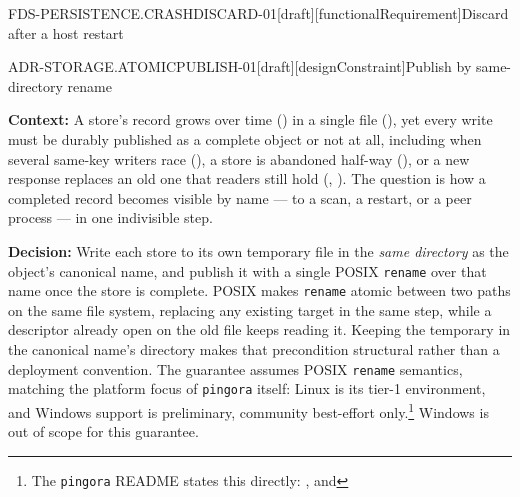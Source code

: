 \begin{requirement}{FDS-PERSISTENCE.CRASHDISCARD-01}[draft][functionalRequirement]{Discard after a host restart}
\end{requirement}

\begin{requirement}{ADR-STORAGE.ATOMICPUBLISH-01}[draft][designConstraint]{Publish by same-directory rename}


  \textbf{Context:} A store's record grows over time
  () in a single file
  (), yet every write must be durably
  published as a complete object or not at all, including when several
  same-key writers race (), a store is
  abandoned half-way (), or a new
  response replaces an old one that readers still hold
  (,
  ). The question is how a completed
  record becomes visible by name --- to a scan, a restart, or a peer process
  --- in one indivisible step.

  \textbf{Decision:} Write each store to its own temporary file in the
  \emph{same directory} as the object's canonical name, and publish it with a
  single POSIX \texttt{rename} over that name once the store is complete.
  POSIX makes \texttt{rename} atomic between two paths on the same file
  system, replacing any existing target in the same step, while a descriptor
  already open on the old file keeps reading it. Keeping the temporary in the
  canonical name's directory makes that precondition structural rather than a
  deployment convention. The guarantee assumes POSIX \texttt{rename}
  semantics, matching the platform focus of \texttt{pingora} itself: Linux is its
  tier-1 environment, and Windows support is preliminary, community
  best-effort only.\footnote{The \texttt{pingora} README states this
  directly: , and } Windows is out of scope for this
  guarantee.


\end{requirement}
